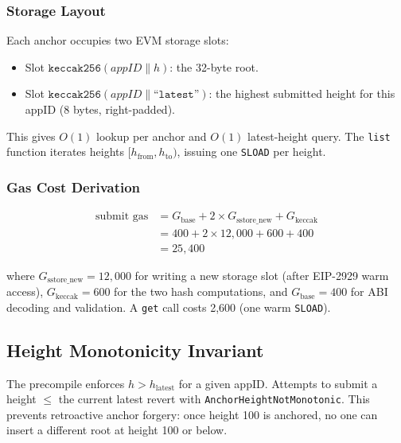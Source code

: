 \documentclass[11pt,a4paper]{article}
\begin{document}
\subsubsection{Storage Layout}

Each anchor occupies two EVM storage slots:

\begin{itemize}[nosep]
  \item Slot $\texttt{keccak256}(\mathit{appID} \| h)$: the 32-byte root.
  \item Slot $\texttt{keccak256}(\mathit{appID} \| \texttt{``latest''})$:
        the highest submitted height for this appID (8 bytes, right-padded).
\end{itemize}

\noindent
This gives $O(1)$ lookup per anchor and $O(1)$ latest-height query. The
\texttt{list} function iterates heights $[h_{\text{from}}, h_{\text{to}})$,
issuing one \texttt{SLOAD} per height.

\subsubsection{Gas Cost Derivation}

\begin{align*}
\text{submit gas} &= G_{\text{base}} + 2 \times G_{\text{sstore\_new}} + G_{\text{keccak}} \\
                  &= 400 + 2 \times 12{,}000 + 600 + 400 \\
                  &= 25{,}400
\end{align*}

\noindent
where $G_{\text{sstore\_new}} = 12{,}000$ for writing a new storage slot
(after EIP-2929 warm access), $G_{\text{keccak}} = 600$ for the two hash
computations, and $G_{\text{base}} = 400$ for ABI decoding and validation.
A \texttt{get} call costs 2,600 (one warm \texttt{SLOAD}).

\subsection{Height Monotonicity Invariant}

The precompile enforces $h > h_{\text{latest}}$ for a given appID. Attempts
to submit a height $\leq$ the current latest revert with
\texttt{AnchorHeightNotMonotonic}. This prevents retroactive anchor
forgery: once height 100 is anchored, no one can insert a different root
at height 100 or below.

\end{document}
